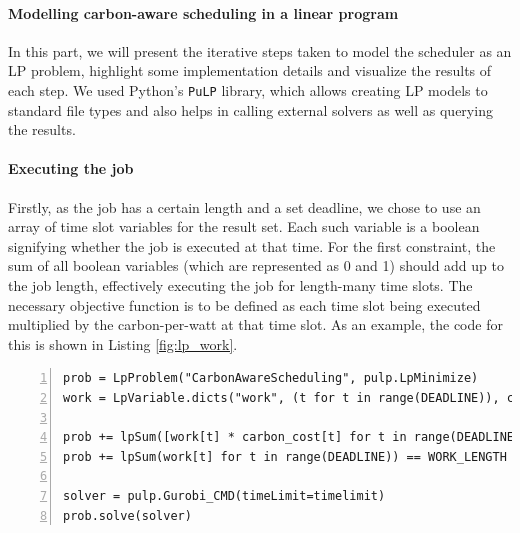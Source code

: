 \paragraph{Modelling carbon-aware scheduling in a linear program}

In this part, we will present the iterative steps taken to model the scheduler as an LP problem, highlight some implementation details and visualize the results of each step.
We used Python's \verb|PuLP| library, which allows creating LP models to standard file types and also helps in calling external solvers as well as querying the results.

\paragraph{Executing the job}

Firstly, as the job has a certain length and a set deadline, we chose to use an array of time slot variables for the result set. Each such variable is a boolean signifying whether the job is executed at that time.
For the first constraint, the sum of all boolean variables (which are represented as 0 and 1) should add up to the job length, effectively executing the job for length-many time slots.
The necessary objective function is to be defined as each time slot being executed multiplied by the carbon-per-watt at that time slot.
As an example, the code for this is shown in Listing \ref{fig:lp_work}.

\begin{minipage}{\linewidth}
\begin{lstlisting}[frame=single, numbers=left, caption={LP Implementation for basic scheduling}, label={list:lp_work}, basicstyle=\ttfamily, breaklines]
prob = LpProblem("CarbonAwareScheduling", pulp.LpMinimize)
work = LpVariable.dicts("work", (t for t in range(DEADLINE)), cat="Binary")

prob += lpSum([work[t] * carbon_cost[t] for t in range(DEADLINE)]) 
prob += lpSum(work[t] for t in range(DEADLINE)) == WORK_LENGTH 

solver = pulp.Gurobi_CMD(timeLimit=timelimit)
prob.solve(solver)
\end{lstlisting}
\end{minipage}

